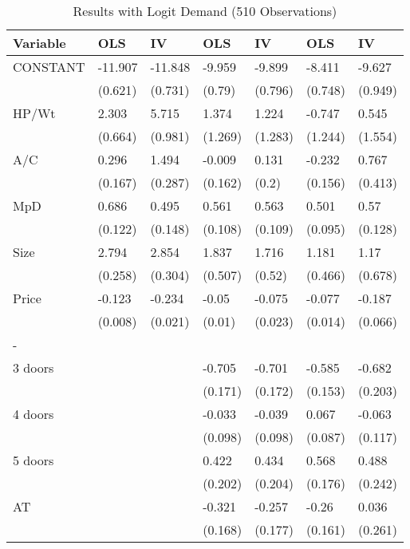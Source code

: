 \documentclass{article}\usepackage[]{graphicx}\usepackage[]{color}
\begin{document}
%


%


%

\begin{table}[ht]
\centering
\caption{Results with Logit Demand 
 (510 Observations)} 
\label{tbl:logit_results}
\begingroup\footnotesize
\begin{tabular}{lllllll}
  \toprule 
 Variable & OLS & IV & OLS & IV & OLS & IV \\
 \midrule 
 CONSTANT & -11.907 & -11.848 & -9.959 & -9.899 & -8.411 & -9.627 \\ 
   & (0.621) & (0.731) & (0.79) & (0.796) & (0.748) & (0.949) \\ 
  HP/Wt & 2.303 & 5.715 & 1.374 & 1.224 & -0.747 & 0.545 \\ 
   & (0.664) & (0.981) & (1.269) & (1.283) & (1.244) & (1.554) \\ 
  A/C & 0.296 & 1.494 & -0.009 & 0.131 & -0.232 & 0.767 \\ 
   & (0.167) & (0.287) & (0.162) & (0.2) & (0.156) & (0.413) \\ 
  MpD & 0.686 & 0.495 & 0.561 & 0.563 & 0.501 & 0.57 \\ 
   & (0.122) & (0.148) & (0.108) & (0.109) & (0.095) & (0.128) \\ 
  Size & 2.794 & 2.854 & 1.837 & 1.716 & 1.181 & 1.17 \\ 
   & (0.258) & (0.304) & (0.507) & (0.52) & (0.466) & (0.678) \\ 
  Price & -0.123 & -0.234 & -0.05 & -0.075 & -0.077 & -0.187 \\ 
   & (0.008) & (0.021) & (0.01) & (0.023) & (0.014) & (0.066) \\ 
  - &  &  &  &  &  &  \\ 
  3 doors &  &  & -0.705 & -0.701 & -0.585 & -0.682 \\ 
   &  &  & (0.171) & (0.172) & (0.153) & (0.203) \\ 
  4 doors &  &  & -0.033 & -0.039 & 0.067 & -0.063 \\ 
   &  &  & (0.098) & (0.098) & (0.087) & (0.117) \\ 
  5 doors &  &  & 0.422 & 0.434 & 0.568 & 0.488 \\ 
   &  &  & (0.202) & (0.204) & (0.176) & (0.242) \\ 
  AT &  &  & -0.321 & -0.257 & -0.26 & 0.036 \\ 
   &  &  & (0.168) & (0.177) & (0.161) & (0.261) \\ 

\end{tabular}
\end{table}
\end{document}
